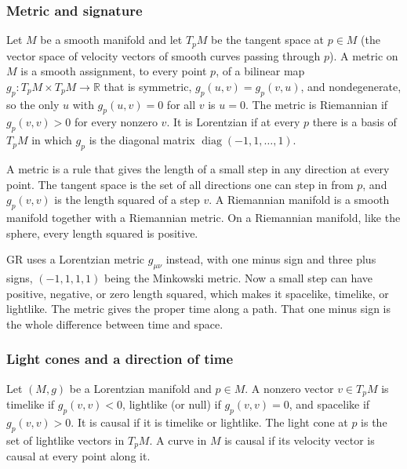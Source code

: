 \subsubsection{Metric and signature}

\begin{definition}[Metric]
Let $M$ be a smooth manifold and let $T_pM$ be the tangent space at $p\in M$ (the vector space of velocity vectors of smooth curves passing through $p$).
A metric on $M$ is a smooth assignment, to every point $p$, of a bilinear map $g_p:T_pM\times T_pM\to\mathbb{R}$ that is symmetric, $g_p(u,v)=g_p(v,u)$, and nondegenerate, so the only $u$ with $g_p(u,v)=0$ for all $v$ is $u=0$.
The metric is Riemannian if $g_p(v,v)>0$ for every nonzero $v$.
It is Lorentzian if at every $p$ there is a basis of $T_pM$ in which $g_p$ is the diagonal matrix $\operatorname{diag}(-1,1,\ldots,1)$.
\end{definition}

A metric is a rule that gives the length of a small step in any direction at every point.
The tangent space is the set of all directions one can step in from $p$, and $g_p(v,v)$ is the length squared of a step $v$.
A Riemannian manifold is a smooth manifold together with a Riemannian metric.
On a Riemannian manifold, like the sphere, every length squared is positive.

GR uses a Lorentzian metric $g_{\mu\nu}$ instead, with one minus sign and three plus signs, $(-1, 1, 1, 1)$ being the Minkowski metric.
Now a small step can have positive, negative, or zero length squared, which makes it spacelike, timelike, or lightlike.
The metric gives the proper time along a path.
That one minus sign is the whole difference between time and space.

\subsubsection{Light cones and a direction of time}

\begin{definition}
Let $(M,g)$ be a Lorentzian manifold and $p\in M$.
A nonzero vector $v\in T_pM$ is timelike if $g_p(v,v)<0$, lightlike (or null) if $g_p(v,v)=0$, and spacelike if $g_p(v,v)>0$.
It is causal if it is timelike or lightlike.
The light cone at $p$ is the set of lightlike vectors in $T_pM$.
A curve in $M$ is causal if its velocity vector is causal at every point along it.
\end{definition}

